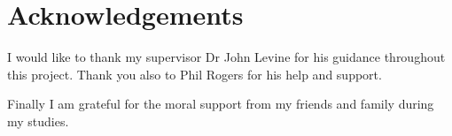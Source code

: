 \chapter*{Acknowledgements}

I would like to thank my supervisor Dr John Levine for his guidance throughout this project.  Thank you also to Phil Rogers for his help and support.

Finally I am grateful for the moral support from my friends and family during my studies.
